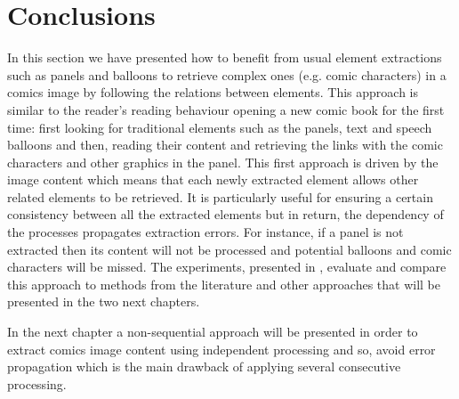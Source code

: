 \section{Conclusions}
\label{sec:se:conclusion}
In this section we have presented how to benefit from usual element extractions such as panels and balloons to retrieve complex ones (e.g. comic characters) in a comics image by following the relations between elements.
This approach is similar to the reader's reading behaviour opening a new comic book for the first time: first looking for traditional elements such as the panels, text and speech balloons and then, reading their content and retrieving the links with the comic characters and other graphics in the panel.
This first approach is driven by the image content which means that each newly extracted element allows other related elements to be retrieved.
It is particularly useful for ensuring a certain consistency between all the extracted elements but in return, the dependency of the processes propagates extraction errors.
For instance, if a panel is not extracted then its content will not be processed and potential balloons and comic characters will be missed.
The experiments, presented in , evaluate and compare this approach to methods from the literature and other approaches that will be presented in the two next chapters.



In the next chapter a non-sequential approach will be presented in order to extract comics image content using independent processing and so, avoid error propagation which is the main drawback of applying several consecutive processing.

